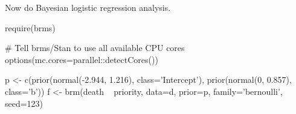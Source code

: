 Now do Bayesian logistic regression analysis.

\begin{Schunk}
\begin{Sinput}
require(brms)
\end{Sinput}
\begin{Sinput}
# Tell brms/Stan to use all available CPU cores
options(mc.cores=parallel::detectCores())
\end{Sinput}
\end{Schunk}

\begin{Schunk}
\begin{Sinput}
p <- c(prior(normal(-2.944, 1.216), class='Intercept'),
       prior(normal(0, 0.857),      class='b'))
f <- brm(death ~ priority, data=d, prior=p, family='bernoulli', seed=123)
\end{Sinput}
\end{Schunk}

